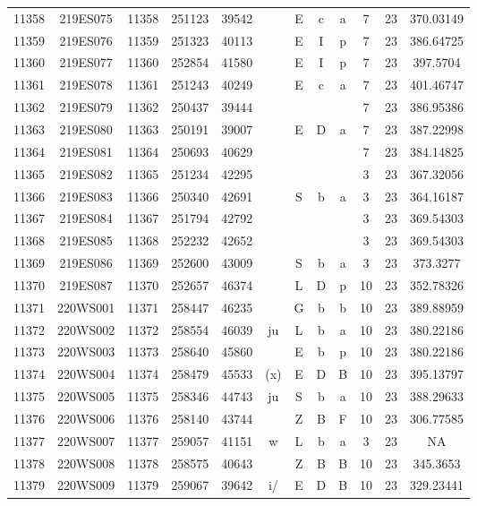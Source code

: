 \begin{tabular}{|*{12}{c|}}
11358 & 219ES075 & 11358 & 251123 & 39542 &  & E & c & a & 7 & 23 & 370.03149 \\ 
11359 & 219ES076 & 11359 & 251323 & 40113 &  & E & I & p & 7 & 23 & 386.64725 \\ 
11360 & 219ES077 & 11360 & 252854 & 41580 &  & E & I & p & 7 & 23 & 397.5704 \\ 
11361 & 219ES078 & 11361 & 251243 & 40249 &  & E & c & a & 7 & 23 & 401.46747 \\ 
11362 & 219ES079 & 11362 & 250437 & 39444 &  &  &  &  & 7 & 23 & 386.95386 \\ 
11363 & 219ES080 & 11363 & 250191 & 39007 &  & E & D & a & 7 & 23 & 387.22998 \\ 
11364 & 219ES081 & 11364 & 250693 & 40629 &  &  &  &  & 7 & 23 & 384.14825 \\ 
11365 & 219ES082 & 11365 & 251234 & 42295 &  &  &  &  & 3 & 23 & 367.32056 \\ 
11366 & 219ES083 & 11366 & 250340 & 42691 &  & S & b & a & 3 & 23 & 364.16187 \\ 
11367 & 219ES084 & 11367 & 251794 & 42792 &  &  &  &  & 3 & 23 & 369.54303 \\ 
11368 & 219ES085 & 11368 & 252232 & 42652 &  &  &  &  & 3 & 23 & 369.54303 \\ 
11369 & 219ES086 & 11369 & 252600 & 43009 &  & S & b & a & 3 & 23 & 373.3277 \\ 
11370 & 219ES087 & 11370 & 252657 & 46374 &  & L & D & p & 10 & 23 & 352.78326 \\ 
11371 & 220WS001 & 11371 & 258447 & 46235 &  & G & b & b & 10 & 23 & 389.88959 \\ 
11372 & 220WS002 & 11372 & 258554 & 46039 & ju & L & b & a & 10 & 23 & 380.22186 \\ 
11373 & 220WS003 & 11373 & 258640 & 45860 &  & E & b & p & 10 & 23 & 380.22186 \\ 
11374 & 220WS004 & 11374 & 258479 & 45533 & (x) & E & D & B & 10 & 23 & 395.13797 \\ 
11375 & 220WS005 & 11375 & 258346 & 44743 & ju & S & b & a & 10 & 23 & 388.29633 \\ 
11376 & 220WS006 & 11376 & 258140 & 43744 &  & Z & B & F & 10 & 23 & 306.77585 \\ 
11377 & 220WS007 & 11377 & 259057 & 41151 & w & L & b & a & 3 & 23 & NA \\ 
11378 & 220WS008 & 11378 & 258575 & 40643 &  & Z & B & B & 10 & 23 & 345.3653 \\ 
11379 & 220WS009 & 11379 & 259067 & 39642 & i/ & E & D & B & 10 & 23 & 329.23441 \\ 

\end{tabular}
